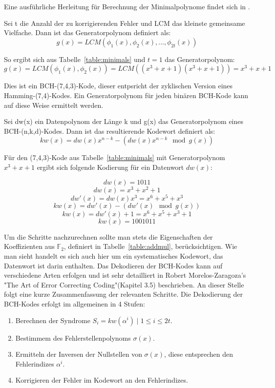 Eine ausführliche Herleitung für Berechnung der Minimalpolynome findet sich in \cite[S. 50ff]{morelos2006art}.

\begin{t_def}
\label{def:genpoly}
Sei t die Anzahl der zu korrigierenden Fehler und LCM das kleinste gemeinsame Vielfache. Dann ist das Generatorpolynom definiert als:
$$g(x) = LCM(\phi_1(x),\phi_2(x),...,\phi_{2t}(x))$$
\end{t_def}

So ergibt sich aus Tabelle~\ref{table:minimals} und $t=1$ das Generatorpolynom:
$$g(x) = LCM(\phi_1(x),\phi_2(x)) = LCM((x^3+x+1)(x^3+x+1)) = x^3+x+1$$

Dies ist ein BCH-(7,4,3)-Kode, dieser entpsricht der zyklischen Version eines Hamming-(7,4)-Kodes. Ein Generatorpolynom für jeden binären BCH-Kode kann auf diese Weise ermittelt werden.

\begin{t_def}
\label{def:encode}
Sei dw(x) ein Datenpolynom der Länge k und g(x) das Generatorpolynom eines BCH-(n,k,d)-Kodes. Dann ist das resultierende Kodewort definiert als:
$$kw(x) = dw(x)x^{n-k} - \left(dw(x)x^{n-k} \mod g(x)\right)$$
\end{t_def}

Für den (7,4,3)-Kode aus Tabelle~\ref{table:minimals} mit Generatorpolynom $x^3+x+1$ ergibt sich folgende Kodierung für ein Datenwort $dw(x)$:

$$dw(x) = 1011$$
$$dw(x) = x^3 + x^2 + 1$$
$$dw'(x) = dw(x)x^3 = x^6 + x^5 + x^3$$
$$kw(x) = dw'(x) - \left(dw'(x) \mod g(x)\right)$$
$$kw(x) = dw'(x) + 1 = x^6 + x^5 + x^3 + 1$$
$$kw(x) = 1001011$$

Um die Schritte nachzurechnen sollte man stets die Eigenschaften der Koeffizienten aus $\mathbb{F}_2$, definiert in Tabelle~\ref{table:addmul}, berücksichtigen.
Wie man sieht handelt es sich auch hier um ein systematisches Kodewort, das Datenwort ist darin enthalten.
\newblock
\newline
Das Dekodieren der BCH-Kodes kann auf verschiedene Arten erfolgen und ist sehr detailliert in Robert Morelos-Zaragoza's "The Art of Error Correcting Coding"(Kapitel 3.5) beschrieben.\cite{morelos2006art}
An dieser Stelle folgt eine kurze Zusammenfassung der relevanten Schritte.
Die Dekodierung der BCH-Kodes erfolgt im allgemeinen in 4 Stufen:

\begin{enumerate}
\item Berechnen der Syndrome $S_i = kw(\alpha^i) \mid 1 \leq i \leq 2t$.
\item Bestimmem des Fehlerstellenpolynoms $\sigma(x)$.
\item Ermitteln der Inversen der Nullstellen von $\sigma(x)$, diese entsprechen den Fehlerindizes $\alpha^i$.
\item Korrigieren der Fehler im Kodewort an den Fehlerindizes.
\end{enumerate}

